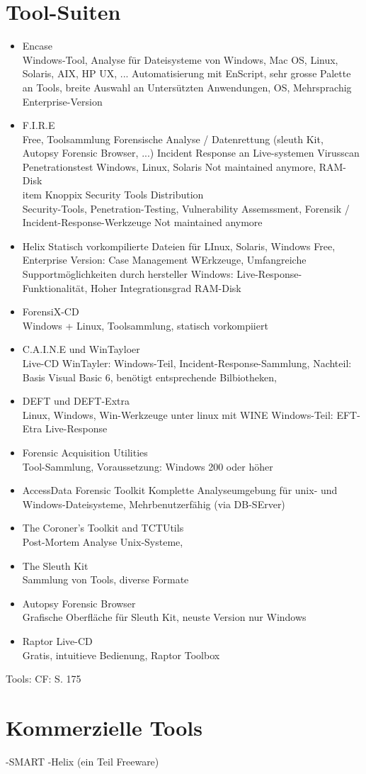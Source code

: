 \section{Tool-Suiten}
\begin{itemize}
\item Encase \\
Windows-Tool, Analyse für Dateisysteme von Windows, Mac OS, Linux, Solaris, AIX, HP UX, ...
Automatisierung mit EnScript, sehr grosse Palette an Tools, breite Auswahl an Untersützten Anwendungen, OS, Mehrsprachig
Enterprise-Version
\item F.I.R.E\\
Free, Toolsammlung
Forensische Analyse / Datenrettung (sleuth Kit, Autopsy Forensic Browser, ...)
Incident Response an Live-systemen
Virusscan
Penetrationstest
Windows, Linux, Solaris
Not maintained anymore,
RAM-Disk
\\item Knoppix Security Tools Distribution\\
Security-Tools, Penetration-Testing, Vulnerability Assemssment, Forensik / Incident-Response-Werkzeuge
Not maintained anymore
\item Helix
Statisch vorkompilierte Dateien für LInux, Solaris, Windows
Free, Enterprise Version: Case Management WErkzeuge, Umfangreiche Supportmöglichkeiten durch hersteller
Windows: Live-Response-Funktionalität, Hoher Integrationsgrad
RAM-Disk
\item ForensiX-CD\\
Windows + Linux, Toolsammlung, statisch vorkompiiert
\item C.A.I.N.E und WinTayloer \\
Live-CD
WinTayler: Windows-Teil, Incident-Response-Sammlung, Nachteil: Basis Visual Basic 6, benötigt entsprechende Bilbiotheken, 
\item DEFT und DEFT-Extra\\
Linux, Windows, Win-Werkzeuge unter linux mit WINE
Windows-Teil: EFT-Etra
Live-Response
\item Forensic Acquisition Utilities \\
Tool-Sammlung, Voraussetzung: Windows 200 oder höher
\item AccessData Forensic Toolkit
Komplette Analyseumgebung für unix- und Windows-Dateisysteme, Mehrbenutzerfähig (via DB-SErver)
\item The Coroner's Toolkit and TCTUtils\\
Post-Mortem Analyse Unix-Systeme, 
\item The Sleuth Kit\\
Sammlung von Tools, diverse Formate
\item Autopsy Forensic Browser\\
Grafische Oberfläche für Sleuth Kit, neuste Version nur Windows
\item Raptor Live-CD\\
Gratis, intuitieve Bedienung, Raptor Toolbox
\end{itemize}


Tools: CF: S. 175



\section{Kommerzielle Tools}
-SMART
-Helix (ein Teil Freeware)
